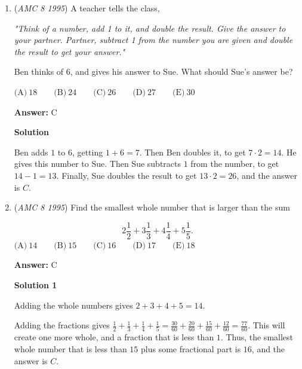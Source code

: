 \begin{enumerate}
\textbf{Solution}

Dividing by $\frac{3}{5}$ is the same as multiplying by its reciprocal, $\frac{5}{3}$.

 Multiplying a number by two numbers is the same as multiplying the number by the product of those two numbers.  Thus, multiplying by $\frac{3}{4}$ and then $\frac{5}{3}$ is the same as multiplying by $\frac{3\cdot 5}{4\cdot 3} = \frac{5}{4}$, and the answer is $\boxed{E}$.

 


	\item (\textit{AMC 8 1995}) A teacher tells the class,


 
\textit{"Think of a number, add 1 to it, and double the result.  Give the answer to your partner.  Partner, subtract 1 from the number you are given and double the result to get your answer."}


 


 Ben thinks of $6$, and gives his answer to Sue.  What should Sue's answer be?


 $\text{(A)}\ 18 \qquad \text{(B)}\ 24 \qquad \text{(C)}\ 26 \qquad \text{(D)}\ 27 \qquad \text{(E)}\ 30$

 \textbf{Answer: }C



\textbf{Solution}

Ben adds $1$ to $6$, getting $1 + 6 = 7$.  Then Ben doubles it, to get $7\cdot 2 = 14$.  He gives this number to Sue.  Then Sue subtracts $1$ from the number, to get $14 - 1 = 13$.  Finally, Sue doubles the result to get $13\cdot 2 = 26$, and the answer is $\boxed{C}$.

 


	\item (\textit{AMC 8 1995}) Find the smallest whole number that is larger than the sum


 
 \[2\dfrac{1}{2}+3\dfrac{1}{3}+4\dfrac{1}{4}+5\dfrac{1}{5}.\]
$\text{(A)}\ 14 \qquad \text{(B)}\ 15 \qquad \text{(C)}\ 16 \qquad \text{(D)}\ 17 \qquad \text{(E)}\ 18$

 \textbf{Answer: }C



\textbf{Solution 1}

Adding the whole numbers gives $2 + 3 + 4 + 5 = 14$.

 Adding the fractions gives $\frac{1}{2} + \frac{1}{3} + \frac{1}{4} + \frac{1}{5} = \frac{30}{60} + \frac{20}{60} + \frac{15}{60} + \frac{12}{60} = \frac{77}{60}$.  This will create one more whole, and a fraction that is less than $1$.  Thus, the smallest whole number that is less than $15$ plus some fractional part is $16$, and the answer is $\boxed{C}$.


\end{enumerate}
